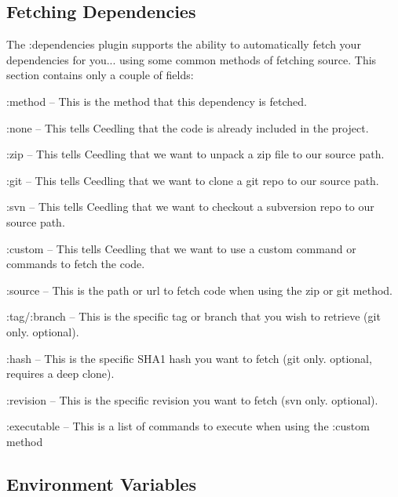 \subsection*{Fetching Dependencies }

The {\ttfamily \+:dependencies} plugin supports the ability to automatically fetch your dependencies for you... using some common methods of fetching source. This section contains only a couple of fields\+:


\begin{DoxyItemize}
\item {\ttfamily \+:method} -- This is the method that this dependency is fetched.
\begin{DoxyItemize}
\item {\ttfamily \+:none} -- This tells Ceedling that the code is already included in the project.
\item {\ttfamily \+:zip} -- This tells Ceedling that we want to unpack a zip file to our source path.
\item {\ttfamily \+:git} -- This tells Ceedling that we want to clone a git repo to our source path.
\item {\ttfamily \+:svn} -- This tells Ceedling that we want to checkout a subversion repo to our source path.
\item {\ttfamily \+:custom} -- This tells Ceedling that we want to use a custom command or commands to fetch the code.
\end{DoxyItemize}
\item {\ttfamily \+:source} -- This is the path or url to fetch code when using the zip or git method.
\item {\ttfamily \+:tag}/{\ttfamily \+:branch} -- This is the specific tag or branch that you wish to retrieve (git only. optional).
\item {\ttfamily \+:hash} -- This is the specific S\+H\+A1 hash you want to fetch (git only. optional, requires a deep clone).
\item {\ttfamily \+:revision} -- This is the specific revision you want to fetch (svn only. optional).
\item {\ttfamily \+:executable} -- This is a list of commands to execute when using the {\ttfamily \+:custom} method
\end{DoxyItemize}

\subsection*{Environment Variables }

